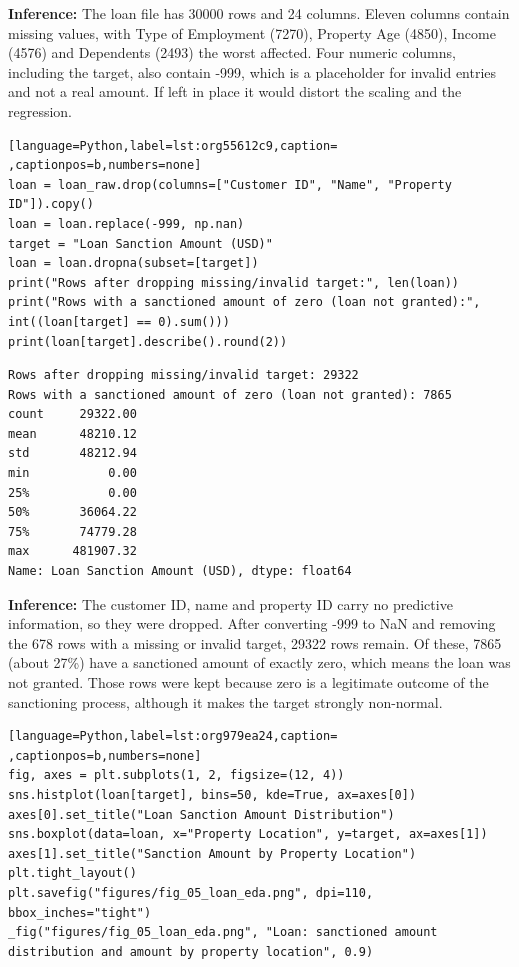 \documentclass[11pt]{article}
\begin{document}
\textbf{Inference:} The loan file has 30000 rows and 24 columns. Eleven columns contain missing values, with
Type of Employment (7270), Property Age (4850), Income (4576) and Dependents (2493) the
worst affected. Four numeric columns, including the target, also contain -999, which is a
placeholder for invalid entries and not a real amount. If left in place it would distort the
scaling and the regression.
\begin{lstlisting}[language=Python,label=lst:org55612c9,caption= ,captionpos=b,numbers=none]
loan = loan_raw.drop(columns=["Customer ID", "Name", "Property ID"]).copy()
loan = loan.replace(-999, np.nan)
target = "Loan Sanction Amount (USD)"
loan = loan.dropna(subset=[target])
print("Rows after dropping missing/invalid target:", len(loan))
print("Rows with a sanctioned amount of zero (loan not granted):", int((loan[target] == 0).sum()))
print(loan[target].describe().round(2))
\end{lstlisting}

\begin{verbatim}
Rows after dropping missing/invalid target: 29322
Rows with a sanctioned amount of zero (loan not granted): 7865
count     29322.00
mean      48210.12
std       48212.94
min           0.00
25%           0.00
50%       36064.22
75%       74779.28
max      481907.32
Name: Loan Sanction Amount (USD), dtype: float64
\end{verbatim}

\textbf{Inference:} The customer ID, name and property ID carry no predictive information, so they were dropped.
After converting -999 to NaN and removing the 678 rows with a missing or invalid target,
29322 rows remain. Of these, 7865 (about 27\%) have a sanctioned amount of exactly zero,
which means the loan was not granted. Those rows were kept because zero is a legitimate
outcome of the sanctioning process, although it makes the target strongly non-normal.
\begin{lstlisting}[language=Python,label=lst:org979ea24,caption= ,captionpos=b,numbers=none]
fig, axes = plt.subplots(1, 2, figsize=(12, 4))
sns.histplot(loan[target], bins=50, kde=True, ax=axes[0])
axes[0].set_title("Loan Sanction Amount Distribution")
sns.boxplot(data=loan, x="Property Location", y=target, ax=axes[1])
axes[1].set_title("Sanction Amount by Property Location")
plt.tight_layout()
plt.savefig("figures/fig_05_loan_eda.png", dpi=110, bbox_inches="tight")
_fig("figures/fig_05_loan_eda.png", "Loan: sanctioned amount distribution and amount by property location", 0.9)
\end{lstlisting}
\end{document}
